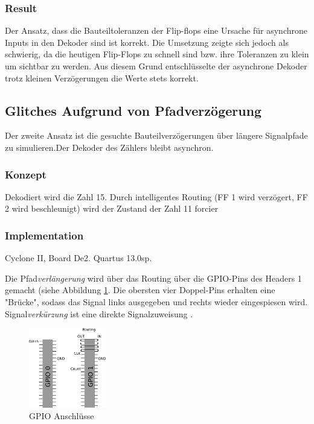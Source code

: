 \subsubsection{Result}
Der Ansatz, dass die Bauteiltoleranzen der Flip-flops eine Ursache für asynchrone Inputs in den Dekoder sind ist korrekt. Die Umsetzung zeigte sich jedoch als schwierig, da die heutigen Flip-Flops zu schnell sind bzw. ihre Toleranzen zu klein um sichtbar zu werden.  Aus diesem Grund entschlüsselte der asynchrone Dekoder trotz kleinen Verzögerungen die Werte stets korrekt.\\


\subsection{Glitches Aufgrund von Pfadverzögerung}\label{sect.glitch_toleranzen}
Der zweite Ansatz ist die gesuchte Bauteilverzögerungen über längere Signalpfade zu simulieren.Der Dekoder des Zählers bleibt asynchron. 

\subsubsection{Konzept}
Dekodiert wird die Zahl 15. Durch intelligentes Routing (FF 1 wird verzögert, FF 2 wird beschleunigt) wird der Zustand der Zahl 11 forcier 

\subsubsection{Implementation} 
Cyclone II, Board De2. Quartus 13.0sp.

Die Pfad\textit{verlängerung} wird über das Routing über die GPIO-Pins des Headers 1 gemacht (siehe Abbildung \ref{fig.glitch.routing}. Die obersten vier Doppel-Pins erhalten eine "Brücke", sodass das Signal links ausgegeben und rechts wieder eingespiesen wird.\\
Signal\textit{verkürzung} ist eine direkte Signalzuweisung  .\\
\begin{figure}[H]
	\centering
	\includegraphics[width=0.3\textwidth]{images/GPIO_Belegung.png}
	\caption{GPIO Anschlüsse}
	\label{fig.glitch.routing}
\end{figure}

